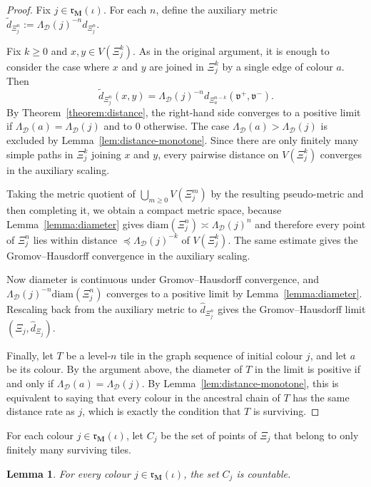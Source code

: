 \documentclass[12pt]{iopart}
\newtheorem{lemma}[theorem]{Lemma}
\newcommand*{\dist}{d}
\newcommand*{\diam}{\mathrm{diam}}
\begin{document}
\begin{proof}
Fix $j\in\mathfrak r_{\mathbf M}(\iota)$.
For each $n$, define the auxiliary metric
$\tilde\dist_{\Xi_j^n}:=\Lambda_{\mathcal D}(j)^{-n}\dist_{\Xi_j^n}$.

Fix $k\ge 0$ and $x,y\in V(\Xi_j^k)$.
As in the original argument, it is enough to consider the case where $x$ and $y$ are joined in $\Xi_j^k$ by a single edge of colour $a$.
Then
\[
\tilde\dist_{\Xi_j^n}(x,y)
=
\Lambda_{\mathcal D}(j)^{-n}
\dist_{\Xi_a^{n-k}}(\mathfrak v^+,\mathfrak v^-).
\]
By Theorem~\ref{theorem:distance}, the right-hand side converges to a positive limit if
$\Lambda_{\mathcal D}(a)=\Lambda_{\mathcal D}(j)$ and to $0$ otherwise.
The case $\Lambda_{\mathcal D}(a)>\Lambda_{\mathcal D}(j)$ is excluded by Lemma~\ref{lem:distance-monotone}.
Since there are only finitely many simple paths in $\Xi_j^k$ joining $x$ and $y$, every pairwise distance on
$V(\Xi_j^k)$ converges in the auxiliary scaling.

Taking the metric quotient of $\bigcup_{m\ge 0}V(\Xi_j^m)$ by the resulting pseudo-metric and then completing it, we obtain a compact metric space, because Lemma~\ref{lemma:diameter} gives
$\diam(\Xi_j^n)\asymp \Lambda_{\mathcal D}(j)^n$ and therefore every point of $\Xi_j^n$ lies within distance
$\preceq \Lambda_{\mathcal D}(j)^{-k}$ of $V(\Xi_j^k)$.
The same estimate gives the Gromov--Hausdorff convergence in the auxiliary scaling.

Now diameter is continuous under Gromov--Hausdorff convergence, and
$\Lambda_{\mathcal D}(j)^{-n}\diam(\Xi_j^n)$ converges to a positive limit by Lemma~\ref{lemma:diameter}.
Rescaling back from the auxiliary metric to $\hat\dist_{\Xi_j^n}$ gives the Gromov--Hausdorff limit
$(\Xi_j,\hat\dist_{\Xi_j})$.

Finally, let $T$ be a level-$n$ tile in the graph sequence of initial colour $j$, and let $a$ be its colour.
By the argument above, the diameter of $T$ in the limit is positive if and only if
$\Lambda_{\mathcal D}(a)=\Lambda_{\mathcal D}(j)$.
By Lemma~\ref{lem:distance-monotone}, this is equivalent to saying that every colour in the ancestral chain of $T$
has the same distance rate as $j$, which is exactly the condition that $T$ is surviving.
\end{proof}

For each colour $j\in\mathfrak r_{\mathbf M}(\iota)$, let $C_j$ be the set of points of $\Xi_j$ that belong to only finitely many surviving tiles.

\begin{lemma}\label{lem:collapsed-countable}
For every colour $j\in\mathfrak r_{\mathbf M}(\iota)$, the set $C_j$ is countable.
\end{lemma}
\end{document}
